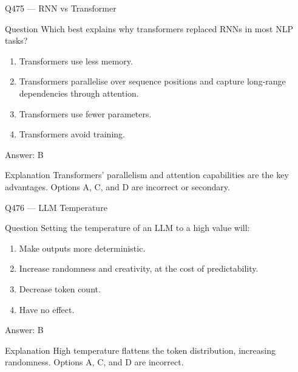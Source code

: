 \documentclass[aspectratio=169,8pt]{beamer}
\begin{document}
	\begin{frame}{Q475 --- RNN vs Transformer}
		\begin{block}{Question}
			Which best explains why transformers replaced RNNs in most NLP tasks?
			\begin{enumerate}
				\item Transformers use less memory.
				\item Transformers parallelise over sequence positions and capture long-range dependencies through attention.
				\item Transformers use fewer parameters.
				\item Transformers avoid training.
			\end{enumerate}
		\end{block}
		\begin{exampleblock}{Answer: B}\end{exampleblock}
		\begin{block}{Explanation}
			Transformers' parallelism and attention capabilities are the key advantages. Options A, C, and D are incorrect or secondary.
		\end{block}
	\end{frame}
	
	\begin{frame}{Q476 --- LLM Temperature}
		\begin{block}{Question}
			Setting the temperature of an LLM to a high value will:
			\begin{enumerate}
				\item Make outputs more deterministic.
				\item Increase randomness and creativity, at the cost of predictability.
				\item Decrease token count.
				\item Have no effect.
			\end{enumerate}
		\end{block}
		\begin{exampleblock}{Answer: B}\end{exampleblock}
		\begin{block}{Explanation}
			High temperature flattens the token distribution, increasing randomness. Options A, C, and D are incorrect.
		\end{block}
	\end{frame}
	
\end{document}

